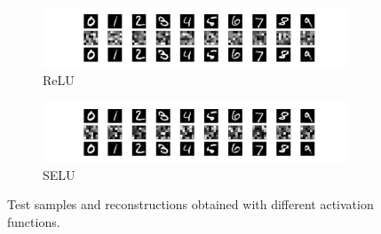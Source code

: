\documentclass[preprint,5p,compress]{elsarticle}
\begin{document}
\begin{figure}[htbp]
  \begin{subfigure}{0.48\textwidth}
    \includegraphics[width=\textwidth,trim={14em 2em 14em 19em},clip]{basic-36-relu-rmsprop-xent.pdf}
    \caption{\label{Fig.act.relu}ReLU}
  \end{subfigure}
  \begin{subfigure}{0.48\textwidth}
    \includegraphics[width=\textwidth,trim={14em 2em 14em 19em},clip]{basic-36-selu-rmsprop-xent.pdf}
    \caption{\label{Fig.act.selu}SELU}
  \end{subfigure}
  \caption{\label{Fig.activations}Test samples and reconstructions obtained with different activation functions.}
\end{figure}
\end{document}
